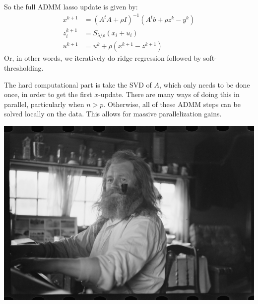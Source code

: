 \begin{frame}[fragile] \frametitle{}

So the full ADMM lasso update is given by:
\begin{align*}
x^{k+1} &= (A^t A + \rho I)^{-1}  (A^t b + \rho z^k - y^k) \\
z^{k+1}_i &= S_{\lambda / \rho} (x_i + u_i) \\
u^{k+1} &= u^k + \rho (x^{k+1} - z^{k+1})
\end{align*}
Or, in other words, we iteratively do ridge regression followed by
soft-thresholding.

\pause The hard computational part is take the SVD of $A$, which only
needs to be done once, in order to get the first $x$-update. There are
many ways of doing this in parallel, particularly when $n > p$. Otherwise,
all of these ADMM steps can be solved locally on the data. This allows
for massive parallelization gains.

\end{frame}

\begin{frame}

\begin{center}
\includegraphics[width=\textwidth]{img/img0.jpg}
\end{center}

\end{frame}

